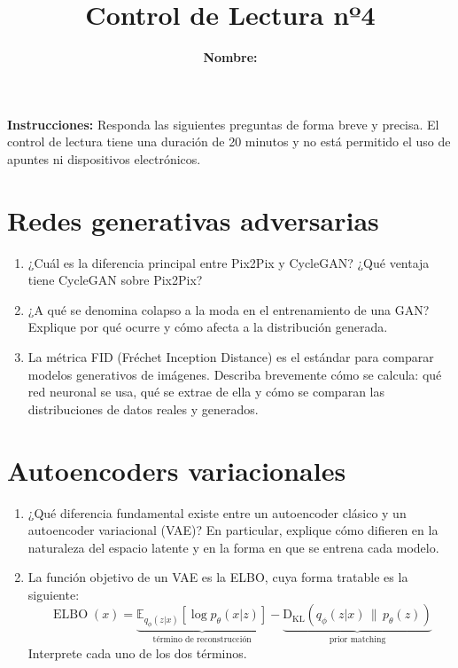 \documentclass{article}
\title{\bfseries{Control de Lectura nº4}\vspace{0.5cm}}
\author{\textbf{Nombre:} \rule{12cm}{0.4pt}}
\begin{document}
\maketitle

\hspace{-0.5cm}\textbf{Instrucciones:} Responda las siguientes preguntas de forma breve y precisa. El control de lectura tiene una duración de 20 minutos y no está permitido el uso de apuntes ni dispositivos electrónicos.

\section*{Redes generativas adversarias}
\begin{enumerate}[{\bf P1.}]
	\item ¿Cuál es la diferencia principal entre Pix2Pix y CycleGAN? ¿Qué ventaja tiene CycleGAN sobre Pix2Pix?

	\item ¿A qué se denomina colapso a la moda en el entrenamiento de una GAN? Explique por qué ocurre y cómo afecta a la distribución generada.

	\item La métrica FID (Fréchet Inception Distance) es el estándar para comparar modelos generativos de imágenes. Describa brevemente cómo se calcula: qué red neuronal se usa, qué se extrae de ella y cómo se comparan las distribuciones de datos reales y generados.
\end{enumerate}

\section*{Autoencoders variacionales}
\begin{enumerate}[{\bf P1.}]
	\item ¿Qué diferencia fundamental existe entre un autoencoder clásico y un autoencoder variacional (VAE)? En particular, explique cómo difieren en la naturaleza del espacio latente y en la forma en que se entrena cada modelo.

	\item La función objetivo de un VAE es la ELBO, cuya forma tratable es la siguiente:
	\begin{equation*}
		\operatorname{ELBO}(x)
		= \underbrace{\mathbb{E}_{q_\phi(z|x)}\!\left[\log p_\theta(x|z)\right]}_{\text{término de reconstrucción}}
		- \underbrace{\operatorname{D_{KL}}\!\left(q_\phi(z|x)\,\|\,p_\theta(z)\right)}_{\text{prior matching}}
	\end{equation*}
	Interprete cada uno de los dos términos.
\end{enumerate}
\end{document}
